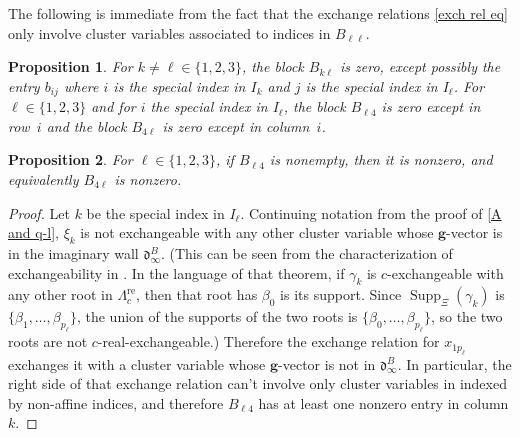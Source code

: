 \documentclass{amsart}
\newtheorem{proposition}{Proposition}[section]
\theoremstyle{definition}
\theoremstyle{remark}
\numberwithin{equation}{section}
\newcommand{\set}[1]{{\lbrace #1 \rbrace}}
\newcommand{\0}{{\mathbf{0}}}
\newcommand{\g}{\mathbf{g}}
\newcommand{\re}{\mathrm{re}}
\renewcommand{\d}{{\mathfrak d}}
\newcommand{\SimplesTChar}{\Xi}
\newcommand{\SuppT}{\operatorname{Supp}_\SimplesTChar}
\newcommand{\APTChar}{\Lambda}
\newcommand{\APT}[1]{\APTChar_{#1}}
\newcommand{\APTre}[1]{\APT{#1}^\re}
\begin{document}
The following  is immediate from the fact that the exchange relations \eqref{exch rel eq} only involve cluster variables associated to indices in $B_{\ell\ell}$.

\begin{proposition}\label{mostly zeros}
For  $k\neq\ell\in\set{1,2,3}$, the block $B_{k\ell}$ is zero, except possibly the entry $b_{ij}$ where $i$ is the special index in $I_k$ and $j$ is the special index in $I_\ell$.
For $\ell\in\set{1,2,3}$ and for $i$ the special index in $I_\ell$, the block $B_{\ell4}$ is zero except in row~$i$ and the block $B_{4\ell}$ is zero except in column~$i$.
\end{proposition}

\begin{proposition}\label{not all zeros}
For $\ell\in\set{1,2,3}$, if $B_{\ell4}$ is nonempty, then it is nonzero, and equivalently $B_{4\ell}$ is nonzero.
\end{proposition}
\begin{proof}
Let $k$ be the special index in $I_\ell$.
Continuing notation from the proof of \cref{A and q-l}, $\xi_k$ is not exchangeable with any other cluster variable whose $\g$-vector is in the imaginary wall $\d^B_\infty$.
(This can be seen from the characterization of exchangeability in \cite[Theorem~7.2]{affdenom}.
In the language of that theorem, if $\gamma_k$ is $c$-exchangeable with any other root in $\APTre{c}$, then that root has $\beta_0$ is its support.
Since $\SuppT(\gamma_k)$ is $\set{\beta_1,\ldots,\beta_{p_\ell}}$, the union of the supports of the two roots is $\set{\beta_0,\ldots,\beta_{p_\ell}}$, so the two roots are not $c$-real-exchangeable.)
Therefore the exchange relation for $x_{1p_\ell}$ exchanges it with a cluster variable whose $\g$-vector is not in $\d^B_\infty$.  
In particular, the right side of that exchange relation can't involve only cluster variables in indexed by non-affine indices, and therefore $B_{\ell4}$ has at least one nonzero entry in column $k$.
\end{proof}
\end{document}
